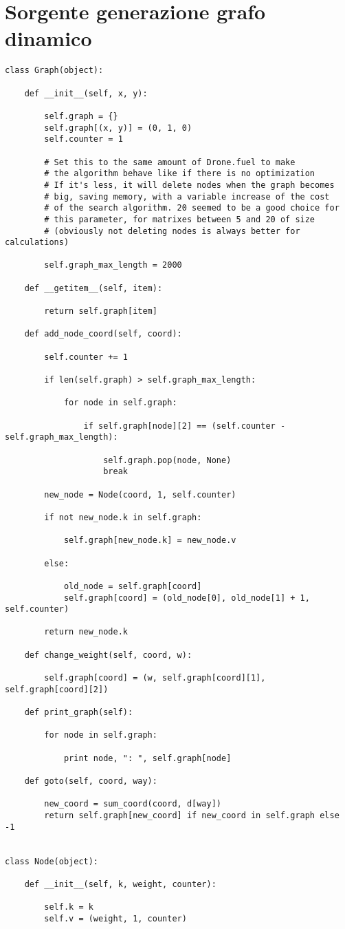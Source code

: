 \section{Sorgente generazione grafo dinamico}
\begin{verbatim}
class Graph(object):

    def __init__(self, x, y):

        self.graph = {}
        self.graph[(x, y)] = (0, 1, 0)
        self.counter = 1

        # Set this to the same amount of Drone.fuel to make
        # the algorithm behave like if there is no optimization
        # If it's less, it will delete nodes when the graph becomes
        # big, saving memory, with a variable increase of the cost
        # of the search algorithm. 20 seemed to be a good choice for
        # this parameter, for matrixes between 5 and 20 of size
        # (obviously not deleting nodes is always better for calculations)

        self.graph_max_length = 2000

    def __getitem__(self, item):

        return self.graph[item]

    def add_node_coord(self, coord):

        self.counter += 1

        if len(self.graph) > self.graph_max_length:

            for node in self.graph:

                if self.graph[node][2] == (self.counter - self.graph_max_length):

                    self.graph.pop(node, None)
                    break

        new_node = Node(coord, 1, self.counter)

        if not new_node.k in self.graph:

            self.graph[new_node.k] = new_node.v

        else:

            old_node = self.graph[coord]
            self.graph[coord] = (old_node[0], old_node[1] + 1, self.counter)

        return new_node.k

    def change_weight(self, coord, w):

        self.graph[coord] = (w, self.graph[coord][1], self.graph[coord][2])

    def print_graph(self):

        for node in self.graph:

            print node, ": ", self.graph[node]

    def goto(self, coord, way):

        new_coord = sum_coord(coord, d[way])
        return self.graph[new_coord] if new_coord in self.graph else -1


class Node(object):

    def __init__(self, k, weight, counter):

        self.k = k
        self.v = (weight, 1, counter)

\end{verbatim}
\pagebreak
